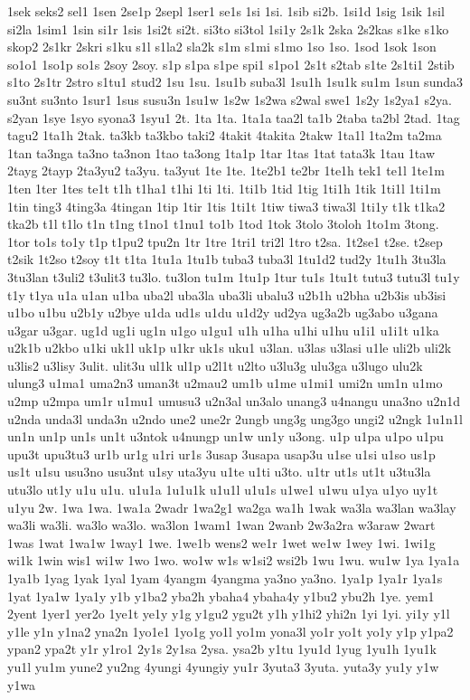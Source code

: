{1sek
seks2
sel1
1sen
2se1p
2sepl
1ser1
se1s
1si
1si.
1sib
si2b.
1si1d
1sig
1sik
1sil
si2la
1sim1
1sin
si1r
1sis
1si2t
si2t.
si3to
si3tol
1si1y
2s1k
2ska
2s2kas
s1ke
s1ko
skop2
2s1kr
2skri
s1ku
s1l
s1la2
sla2k
s1m
s1mi
s1mo
1so
1so.
1sod
1sok
1son
so1o1
1so1p
so1s
2soy
2soy.
s1p
s1pa
s1pe
spi1
s1po1
2s1t
s2tab
s1te
2s1ti1
2stib
s1to
2s1tr
2stro
s1tu1
stud2
1su
1su.
1su1b
suba3l
1su1h
1su1k
su1m
1sun
sunda3
su3nt
su3nto
1sur1
1sus
susu3n
1su1w
1s2w
1s2wa
s2wal
swe1
1s2y
1s2ya1
s2ya.
s2yan
1sye
1syo
syona3
1syu1
2t.
1ta
1ta.
1ta1a
taa2l
ta1b
2taba
ta2bl
2tad.
1tag
tagu2
1ta1h
2tak.
ta3kb
ta3kbo
taki2
4takit
4takita
2takw
1ta1l
1ta2m
ta2ma
1tan
ta3nga
ta3no
ta3non
1tao
ta3ong
1ta1p
1tar
1tas
1tat
tata3k
1tau
1taw
2tayg
2tayp
2ta3yu2
ta3yu.
ta3yut
1te
1te.
1te2b1
te2br
1te1h
tek1
te1l
1te1m
1ten
1ter
1tes
te1t
t1h
t1ha1
t1hi
1ti
1ti.
1ti1b
1tid
1tig
1ti1h
1tik
1ti1l
1ti1m
1tin
ting3
4ting3a
4tingan
1tip
1tir
1tis
1ti1t
1tiw
tiwa3
tiwa3l
1ti1y
t1k
t1ka2
tka2b
t1l
t1lo
t1n
t1ng
t1no1
t1nu1
to1b
1tod
1tok
3tolo
3toloh
1to1m
3tong.
1tor
to1s
to1y
t1p
t1pu2
tpu2n
1tr
1tre
1tri1
tri2l
1tro
t2sa.
1t2se1
t2se.
t2sep
t2sik
1t2so
t2soy
t1t
t1ta
1tu1a
1tu1b
tuba3
tuba3l
1tu1d2
tud2y
1tu1h
3tu3la
3tu3lan
t3uli2
t3ulit3
tu3lo.
tu3lon
tu1m
1tu1p
1tur
tu1s
1tu1t
tutu3
tutu3l
tu1y
t1y
t1ya
u1a
u1an
u1ba
uba2l
uba3la
uba3li
ubalu3
u2b1h
u2bha
u2b3is
ub3isi
u1bo
u1bu
u2b1y
u2bye
u1da
ud1s
u1du
u1d2y
ud2ya
ug3a2b
ug3abo
u3gana
u3gar
u3gar.
ug1d
ug1i
ug1n
u1go
u1gu1
u1h
u1ha
u1hi
u1hu
u1i1
u1i1t
u1ka
u2k1b
u2kbo
u1ki
uk1l
uk1p
u1kr
uk1s
uku1
u3lan.
u3las
u3lasi
u1le
uli2b
uli2k
u3lis2
u3lisy
3ulit.
ulit3u
ul1k
ul1p
u2l1t
u2lto
u3lu3g
ulu3ga
u3lugo
ulu2k
ulung3
u1ma1
uma2n3
uman3t
u2mau2
um1b
u1me
u1mi1
umi2n
um1n
u1mo
u2mp
u2mpa
um1r
u1mu1
umusu3
u2n3al
un3alo
unang3
u4nangu
una3no
u2n1d
u2nda
unda3l
unda3n
u2ndo
une2
une2r
2ungb
ung3g
ung3go
ungi2
u2ngk
1u1n1l
un1n
un1p
un1s
un1t
u3ntok
u4nungp
un1w
un1y
u3ong.
u1p
u1pa
u1po
u1pu
upu3t
upu3tu3
ur1b
ur1g
u1ri
ur1s
3usap
3usapa
usap3u
u1se
u1si
u1so
us1p
us1t
u1su
usu3no
usu3nt
u1sy
uta3yu
u1te
u1ti
u3to.
u1tr
ut1s
ut1t
u3tu3la
utu3lo
ut1y
u1u
u1u.
u1u1a
1u1u1k
u1u1l
u1u1s
u1we1
u1wu
u1ya
u1yo
uy1t
u1yu
2w.
1wa
1wa.
1wa1a
2wadr
1wa2g1
wa2ga
wa1h
1wak
wa3la
wa3lan
wa3lay
wa3li
wa3li.
wa3lo
wa3lo.
wa3lon
1wam1
1wan
2wanb
2w3a2ra
w3araw
2wart
1was
1wat
1wa1w
1way1
1we.
1we1b
wens2
we1r
1wet
we1w
1wey
1wi.
1wi1g
wi1k
1win
wis1
wi1w
1wo
1wo.
wo1w
w1s
w1si2
wsi2b
1wu
1wu.
wu1w
1ya
1ya1a
1ya1b
1yag
1yak
1yal
1yam
4yangm
4yangma
ya3no
ya3no.
1ya1p
1ya1r
1ya1s
1yat
1ya1w
1ya1y
y1b
y1ba2
yba2h
ybaha4
ybaha4y
y1bu2
ybu2h
1ye.
yem1
2yent
1yer1
yer2o
1ye1t
ye1y
y1g
y1gu2
ygu2t
y1h
y1hi2
yhi2n
1yi
1yi.
yi1y
y1l
y1le
y1n
y1na2
yna2n
1yo1e1
1yo1g
yo1l
yo1m
yona3l
yo1r
yo1t
yo1y
y1p
y1pa2
ypan2
ypa2t
y1r
y1ro1
2y1s
2y1sa
2ysa.
ysa2b
y1tu
1yu1d
1yug
1yu1h
1yu1k
yu1l
yu1m
yune2
yu2ng
4yungi
4yungiy
yu1r
3yuta3
3yuta.
yuta3y
yu1y
y1w
y1wa
}
